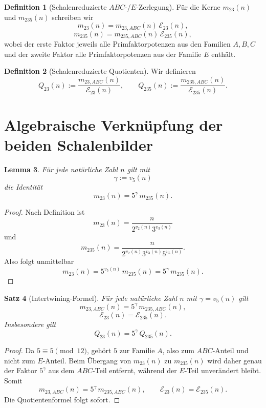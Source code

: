 \documentclass[11pt,a4paper]{article}
\newtheorem{satz}{Satz}
\newtheorem{lemma}[satz]{Lemma}
\theoremstyle{definition}
\newtheorem{definition}[satz]{Definition}
\theoremstyle{remark}
\begin{document}
	\begin{definition}[Schalenreduzierte \(ABC\)-/\(E\)-Zerlegung]
		Für die Kerne \(m_{23}(n)\) und \(m_{235}(n)\) schreiben wir
		\[
		m_{23}(n)=m_{23,ABC}(n)\,\mathcal E_{23}(n),
		\]
		\[
		m_{235}(n)=m_{235,ABC}(n)\,\mathcal E_{235}(n),
		\]
		wobei der erste Faktor jeweils alle Primfaktorpotenzen aus den Familien \(A,B,C\) und der zweite
		Faktor alle Primfaktorpotenzen aus der Familie \(E\) enthält.
	\end{definition}
	
	\begin{definition}[Schalenreduzierte Quotienten]
		Wir definieren
		\[
		Q_{23}(n):=\frac{m_{23,ABC}(n)}{\mathcal E_{23}(n)},
		\qquad
		Q_{235}(n):=\frac{m_{235,ABC}(n)}{\mathcal E_{235}(n)}.
		\]
	\end{definition}
	
	\section{Algebraische Verknüpfung der beiden Schalenbilder}
	
	\begin{lemma}
		Für jede natürliche Zahl \(n\) gilt mit
		\[
		\gamma:=v_5(n)
		\]
		die Identität
		\[
		m_{23}(n)=5^\gamma\,m_{235}(n).
		\]
	\end{lemma}
	
	\begin{proof}
		Nach Definition ist
		\[
		m_{23}(n)=\frac{n}{2^{v_2(n)}3^{v_3(n)}}
		\]
		und
		\[
		m_{235}(n)=\frac{n}{2^{v_2(n)}3^{v_3(n)}5^{v_5(n)}}.
		\]
		Also folgt unmittelbar
		\[
		m_{23}(n)=5^{v_5(n)}\,m_{235}(n)=5^\gamma\,m_{235}(n).
		\]
	\end{proof}
	
	\begin{satz}[Intertwining-Formel]
		Für jede natürliche Zahl \(n\) mit \(\gamma=v_5(n)\) gilt
		\[
		m_{23,ABC}(n)=5^\gamma\,m_{235,ABC}(n),
		\]
		\[
		\mathcal E_{23}(n)=\mathcal E_{235}(n).
		\]
		Insbesondere gilt
		\[
		Q_{23}(n)=5^\gamma\,Q_{235}(n).
		\]
	\end{satz}
	
	\begin{proof}
		Da \(5\equiv 5\pmod{12}\), gehört \(5\) zur Familie \(A\), also zum \(ABC\)-Anteil und nicht zum
		\(E\)-Anteil. Beim Übergang von \(m_{23}(n)\) zu \(m_{235}(n)\) wird daher genau der Faktor
		\(5^\gamma\) aus dem \(ABC\)-Teil entfernt, während der \(E\)-Teil unverändert bleibt. Somit
		\[
		m_{23,ABC}(n)=5^\gamma\,m_{235,ABC}(n),
		\qquad
		\mathcal E_{23}(n)=\mathcal E_{235}(n).
		\]
		Die Quotientenformel folgt sofort.
	\end{proof}
	
\end{document}

